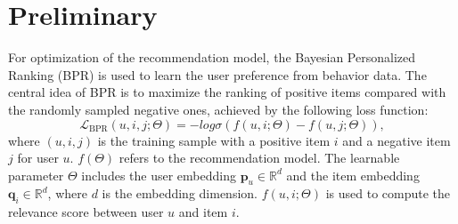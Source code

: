 \section{Preliminary}
For optimization of the recommendation model, the Bayesian Personalized Ranking (BPR) is used to learn the user preference from behavior data. The central idea of BPR is to maximize the ranking of positive items compared with the randomly sampled negative ones, achieved by the following loss function: 
\begin{equation}
    \mathcal{L}_\text{BPR}(u,i,j;\Theta)=-log\sigma(f(u,i;\Theta) - f(u,j;\Theta)),
\end{equation}
where $(u,i,j)$ is the training sample with a positive item $i$ and a negative item $j$ for user $u$. $f(\Theta)$ refers to the recommendation model. The learnable parameter $\Theta$ includes the user embedding $\mathbf{p}_u \in \mathbb{R}^d$ and the item embedding $\mathbf{q}_i \in \mathbb{R}^d$, where $d$ is the embedding dimension. $f(u,i;\Theta)$ is used to compute the relevance score between user $u$ and item $i$.
